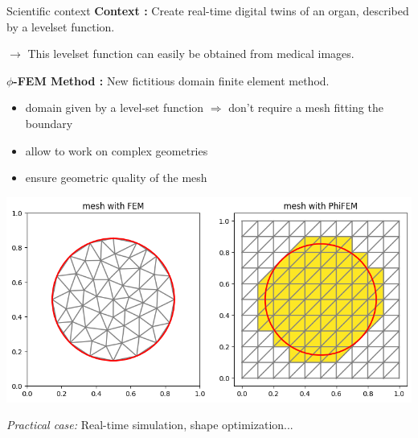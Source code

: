 \begin{frame}{Scientific context}
    \textbf{Context :} Create real-time digital twins of an organ, described by a levelset function.
    
    $\rightarrow$ This levelset function can easily be obtained from medical images.

    \textbf{$\phi$-FEM Method :} New fictitious domain finite element method.

    \begin{itemize}[]
        \item domain given by a level-set function $\Rightarrow$ don't require a mesh fitting the boundary 
        \item allow to work on complex geometries 
        \item ensure geometric quality of the mesh
    \end{itemize}
    
    \begin{center}
        \includegraphics[width=0.55\linewidth]{images/intro/context_geometry.png}
    \end{center}	

    \textit{Practical case:} Real-time simulation, shape optimization...
\end{frame}

